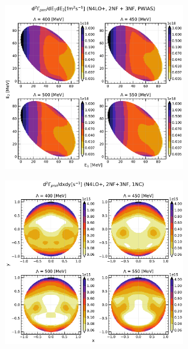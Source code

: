     \begin{figure}[h]
        \begin{center}
        \includegraphics[width=0.7\textwidth]{PlotData/PION/Dalitz_maps/figures/Dalitz_map_pnn_E1E2_cutofs_PWIAS.pdf}
        \end{center}
        \caption{}
        \label{pion_map_E1E2_cutoff_PW}
    \end{figure}

    \begin{figure}[h]
        \begin{center}
        \includegraphics[width=0.7\textwidth]{PlotData/PION/Dalitz_maps/figures/Dalitz_map_pnn_xy_cutofs_1NC.pdf}
        \end{center}
        \caption{}
        \label{pion_map_xy_cutoff_1NC}
    \end{figure}

